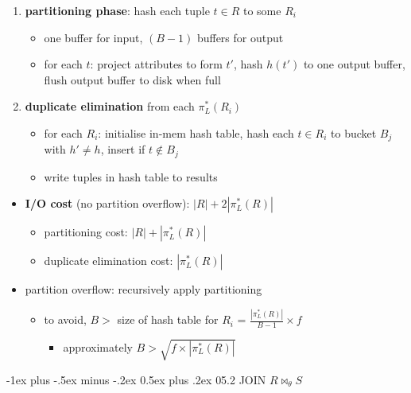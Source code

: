 \documentclass[10pt, landscape]{article}
\makeatletter
\renewcommand{\section}{\@startsection{section}{1}{0mm}%
  {-1ex plus -.5ex minus -.2ex}%
  {0.5ex plus .2ex}%
{\normalfont\large\bfseries}}
\makeatother
\begin{document}
\begin{multicols*}{4}
  \begin{enumerate}
    \item \textbf{partitioning phase}: hash each tuple $t \in R$ to some $R_i$
          \begin{itemize}
            \item one buffer for input, $(B-1)$ buffers for output
            \item for each $t$: project attributes to form $t'$, hash $h(t')$ to one output buffer, flush output buffer to disk when full
          \end{itemize}
    \item \textbf{duplicate elimination} from each $\pi^*_L(R_i)$
          \begin{itemize}
            \item for each $R_i$: initialise in-mem hash table, hash each $t \in R_i$ to bucket $B_j$ with $h' \neq h$, insert if $t \not\in B_j$
            \item write tuples in hash table to results
          \end{itemize}
  \end{enumerate}

  \begin{itemize}
    \item \textbf{I/O cost} (no partition overflow): $|R| + 2|\pi^*_L(R)|$
          \begin{itemize}
            \item partitioning cost: $|R| + |\pi^*_L(R)|$
            \item duplicate elimination cost: $|\pi^*_L(R)|$
          \end{itemize}
    \item partition overflow: recursively apply partitioning
          \begin{itemize}
            \item to avoid, $B>$ size of hash table for $R_i$ = $\frac{|\pi^*_L(R)|}{B-1} \times f$
                  \begin{itemize}
                    \item  approximately $B> \sqrt{f\times |\pi^*_L(R)|}$
                  \end{itemize}
          \end{itemize}
  \end{itemize}

  \section{05.2 JOIN $R \bowtie_\theta S$}


\end{multicols*}
\end{document}
